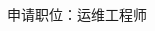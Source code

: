 \documentclass[12pt]{test}
\begin{document}
\begin{minipage}[t]{0.45\textwidth} %
	\vspace{-\baselineskip} %
	{{}}
	\vspace{3pt}
	
	{申请职位：运维工程师} %
\end{minipage}
\begin{minipage}[t]{0.26\textwidth} %
	\vspace{-\baselineskip} %
	\\
	\\
	
\end{minipage}
\begin{minipage}[t]{0.275\textwidth} %
	\vspace{-\baselineskip} %
	
	\\	
	\\
\end{minipage}

\vspace{0.5cm}

\begin{minipage}[t]{0.5\textwidth} %
\end{minipage}
\hfill %
\begin{minipage}[t]{0.6\textwidth} %
\begin{barchart}{6.5}
	\end{barchart}
\end{minipage}
\vspace{0.5cm}
\end{document}
